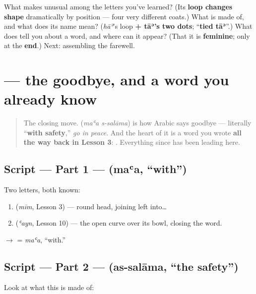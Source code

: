 \begin{tcolorbox}[breakable,colback=teal!4,colframe=teal!35!black,title={Before you move on}]
What makes \textbf{} unusual among the letters you've learned? (Its \textbf{loop changes shape} dramatically by position — four very different coats.) What is \textbf{} made of, and what does its name mean? (\emph{hāʾ}'s loop \textbf{+ tāʾ's two dots}; \textquotedblleft{}\textbf{tied tāʾ}\textquotedblright{}.) What does \textbf{} tell you about a word, and where can it appear? (That it is \textbf{feminine}; only at the \textbf{end}.) Next: assembling the farewell.
\end{tcolorbox}
\section[\texorpdfstring{\ar{مع} \ar{السلامة} (maʿa s-salāma)}{مع السلامة (maʿa s-salāma)}]{  — the goodbye, and a word you already know}

\label{lesson:AR-W12-maa-salama}



\begin{quote}
The closing move. \textbf{ } (\emph{maʿa s-salāma}) is how Arabic says goodbye — literally \textquotedblleft{}\textbf{with safety},\textquotedblright{} \emph{go in peace}. And the heart of it is a word you wrote \textbf{all the way back in Lesson 3}: \textbf{}. Everything since has been leading here.
\end{quote}

\subsection*{Script — Part 1 —  (maʿa, \textquotedblleft{}with\textquotedblright{})}
Two letters, both known:

\begin{enumerate}
\raggedright
  \item \textbf{} (\emph{mīm}, Lesson 3) — round head, joining left into…
  \item \textbf{} (\emph{ʿayn}, Lesson 10) — the open curve over its bowl, closing the word.
\end{enumerate}

$\to$ \textbf{} = \emph{maʿa}, \textquotedblleft{}with.\textquotedblright{}

\subsection*{Script — Part 2 —  (as-salāma, \textquotedblleft{}the safety\textquotedblright{})}
Look at what this is made of:

